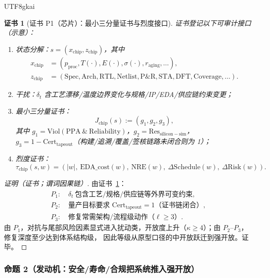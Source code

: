 \documentclass[12pt]{article}
\newtheorem{Certificate}{证书}[section]
\newcommand{\Res}{\ensuremath{\mathrm{Res}}}
\newcommand{\Cert}{\ensuremath{\mathrm{Cert}}}
\begin{document}
\begin{CJK*}{UTF8}{gkai}
\begin{Certificate}[证书 P1（芯片）：最小三分量证书与烈度接口]
\label{cert:tex25-chip}
证书登记以下可审计接口（示意）：
\begin{enumerate}
  \item 状态分解：$s=(x_{\mathrm{chip}},z_{\mathrm{chip}})$，其中
  \[
    \begin{aligned}
      x_{\mathrm{chip}}
      &= (p_{\mathrm{proc}},T(\cdot),E(\cdot),\sigma(\cdot),r_{\mathrm{aging}},\dots),
      \\
      z_{\mathrm{chip}}
      &= (\mathrm{Spec},\mathrm{Arch},\mathrm{RTL},\mathrm{Netlist},\mathrm{P\&R},\mathrm{STA},\mathrm{DFT},
      \mathrm{Coverage},\dots).
    \end{aligned}
  \]
  \item 干扰：$\delta_t$ 含工艺漂移/温度边界变化与规格/IP/EDA/供应链约束变更；
  \item 最小三分量证书：
  \[
    J_{\mathrm{chip}}(s):=(g_1,g_2,g_3),
  \]
  其中 $g_1=\mathrm{Viol}(\mathrm{PPA}\ \&\ \mathrm{Reliability})$，$g_2=\Res_{\mathrm{silicon-sim}}$，
  $g_3=1-\Cert_{\mathrm{tapeout}}$（构建/追溯/覆盖/签核链路未闭合则为 1）；
  \item 烈度证书：
  \[
    \tau_{\mathrm{chip}}(s,w)=(|w|,\ \mathrm{EDA\_cost}(w),\ \mathrm{NRE}(w),\ \Delta\mathrm{Schedule}(w),\
      \Delta\mathrm{Risk}(w)).
  \]
\end{enumerate}
\end{Certificate}

\begin{proof}[证明（证书；谓词因果链）]
由证书~\ref{cert:tex25-chip}：
\[
  \begin{aligned}
    P_1:&\ \delta_t\ \text{包含工艺/规格/供应链等外界可变约束},\\
    P_2:&\ \text{量产目标要求 }\Cert_{\mathrm{tapeout}}=1\text{（证书链闭合）},\\
    P_3:&\ \text{修复常需架构/流程级动作（}\ell\ge 3\text{）}.
  \end{aligned}
\]
由 $P_1$，对抗与尾部风险因素显式进入扰动类，开放度上升（$\kappa\ge 4$）；由 $P_2$--$P_3$，修复深度至少达到体系结构级，
因此等级从原型口径的中开放跃迁到强开放。证毕。
\end{proof}

\subsubsection{命题 2（发动机：安全/寿命/合规把系统推入强开放）}
\label{subsubsec:tex25-engine}


\end{CJK*}
\end{document}
